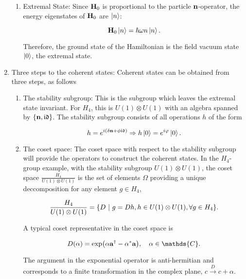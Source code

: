 \documentclass{homework}
\begin{document}
\begin{enumerate}
\begin{enumerate}
            \item Extremal State: Since ${\bf H}_0$ is proportional to      the particle ${\bf n}$-operator, the energy            eigenstates of ${\bf H}_0$ are $\ket{n}$: 
            
            $$
                {\bf H}_0 \ket{n} = \hbar \omega n \ket{n}. 
            $$
            
            Therefore, the ground state of the Hamiltonian is the field vacuum state $\ket{0}$, the extremal state. \\
              
          \end{enumerate}
         
         \item Three steps to the coherent states: Coherent states can be obtained from three steps, as follows
         
         \begin{enumerate}
             \item The stability subgroup: This is the subgroup which leaves the extremal state invariant. For $H_4$, this is $U(1) \otimes U(1)$ with an algebra spanned by $\{{\bf n}, \mathfrak{i}\mathfrak{d}\}$. The stability subgroup consists of all operations $h$ of the form
                    
                    $$
                        h = e^{i(\delta {\bf n} + \phi \mathfrak{i}\mathfrak{d})} \Rightarrow h \ket{0} = e^{i\varphi} \ket{0}.
                    $$
            
            \item The coset space: The coset space with respect to the       stability subgroup will provide the operators to    
                  construct the coherent states. In the $H_4$-group example, with the stability subgroup $U(1)\otimes U(1)$, the coset space $\frac{H_4}{U(1)\otimes U(1)}$ is the set of elements $\Omega$ providing a unique deccomposition for any element $g \in H_4$, 
                  
                  $$
                   \frac{H_4}{U(1)\otimes U(1)} = \{ D \textnormal{ } | \textnormal{ } g = Dh, h \in U(1)\otimes U(1), \forall g \in H_4\}.
                  $$
                  
                  A typical coset representative in the coset space is 
                  
                  $$
                    D(\alpha) = \exp(\alpha {\bf a}^\dagger - \alpha^{*} {\bf a}), \quad \alpha \in \mathds{C}.
                  $$
                  
                  The argument in the exponential operator is anti-hermitian and corresponds to a finite transformation in the complex plane, $c \overset{D}{\rightarrow} c + \alpha$.
                  
                  
         \end{enumerate}
         
         
\end{enumerate}



\end{document}
